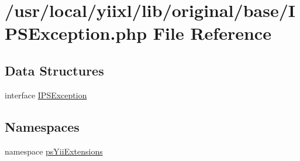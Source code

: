\hypertarget{IPSException_8php}{
\section{/usr/local/yiixl/lib/original/base/IPSException.php File Reference}
\label{IPSException_8php}
}
\subsection*{Data Structures}
\begin{DoxyCompactItemize}
\item 
interface \hyperlink{interfaceIPSException}{IPSException}
\end{DoxyCompactItemize}
\subsection*{Namespaces}
\begin{DoxyCompactItemize}
\item 
namespace \hyperlink{namespacepsYiiExtensions}{psYiiExtensions}
\end{DoxyCompactItemize}
